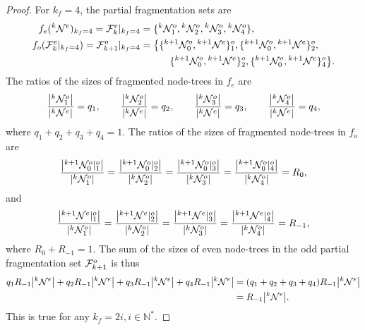\begin{proof}
  For $k_f = 4$, the partial fragmentation sets are
  \begin{align*}
    f_e({}^{k}\mathcal{N}^e)_{k_f = 4} 
    = \mathcal{F}^e_{k}|_{k_f = 4} 
    &=\{ {}^{k}\mathcal{N}^{o}_1, {}^{k}\mathcal{N}^{o}_2,  {}^{k}\mathcal{N}^{o}_3,{}^{k}\mathcal{N}^{o}_4\},  \\
    f_o(\mathcal{F}^e_{k}|_{k_f = 4}) 
    = \mathcal{F}^o_{k+1} |_{k_f = 4} 
    &= \big\{      \{ {}^{k+1}\mathcal{N}^{o}_0, {}^{k+1}\mathcal{N}^e\}^o_1, 
                    \{ {}^{k+1}\mathcal{N}^{o}_0, {}^{k+1}\mathcal{N}^e\}^o_2, \\
    & \hspace{3em} \{ {}^{k+1}\mathcal{N}^{o}_0, {}^{k+1}\mathcal{N}^e\}^o_2,
                    \{ {}^{k+1}\mathcal{N}^{o}_0, {}^{k+1}\mathcal{N}^e\}^o_4 \big\}. 
  \end{align*}
  The ratios of the sizes of fragmented node-trees in $f_e$ are
  \begin{equation*}
    \frac{\abs{{}^{k} \mathcal{N}^{o}_1}}{\abs{{}^{k}\mathcal{N}^e}} = q_1, \hspace{2em}
    \frac{\abs{{}^{k} \mathcal{N}^{o}_2}}{\abs{{}^{k}\mathcal{N}^e}} = q_2, \hspace{2em}
    \frac{\abs{{}^{k} \mathcal{N}^{o}_3}}{\abs{{}^{k}\mathcal{N}^e}} = q_3, \hspace{2em}
    \frac{\abs{{}^{k} \mathcal{N}^{o}_4}}{\abs{{}^{k}\mathcal{N}^e}} = q_4, 
  \end{equation*}
  where $ q_1 + q_2 + q_3 + q_4 = 1$. The ratios of the sizes of fragmented node-trees in $f_o$ are
  \begin{equation*}
    \frac{\abs{{}^{k+1}\mathcal{N}^o_0|^o_1}}{\abs{{}^{k} \mathcal{N}^{o}_1}} = 
    \frac{\abs{{}^{k+1}\mathcal{N}^o_0|^o_2}}{\abs{{}^{k} \mathcal{N}^{o}_2}} = 
    \frac{\abs{{}^{k+1}\mathcal{N}^o_0|^o_3}}{\abs{{}^{k} \mathcal{N}^{o}_3}} = 
    \frac{\abs{{}^{k+1}\mathcal{N}^o_0|^o_4}}{\abs{{}^{k} \mathcal{N}^{o}_4}} = R_0,
  \end{equation*}
  and 
  \begin{equation*}
    \frac{\abs{{}^{k+1}\mathcal{N}^e|^o_1}}{\abs{{}^{k} \mathcal{N}^{o}_1}} = 
    \frac{\abs{{}^{k+1}\mathcal{N}^e|^o_2}}{\abs{{}^{k} \mathcal{N}^{o}_2}} = 
    \frac{\abs{{}^{k+1}\mathcal{N}^e|^o_3}}{\abs{{}^{k} \mathcal{N}^{o}_3}} = 
    \frac{\abs{{}^{k+1}\mathcal{N}^e|^o_4}}{\abs{{}^{k} \mathcal{N}^{o}_4}} = R_{-1},  
  \end{equation*}
  where $R_0 + R_{-1} = 1$. The sum of the sizes of even node-trees in  the odd partial fragmentation set $\mathcal{F}^o_{k+1}$ is thus
  \begin{align*}
    q_1 R_{-1} \abs{{}^{k}\mathcal{N}^e} + q_2 R_{-1} \abs{{}^{k}\mathcal{N}^e} + q_3 R_{-1} \abs{{}^{k}\mathcal{N}^e} + q_4 R_{-1} \abs{{}^{k}\mathcal{N}^e} 
    &= (q_1 + q_2 + q_3 + q_4 ) R_{-1} \abs{{}^{k}\mathcal{N}^e} \\
    &= R_{-1} \abs{{}^{k}\mathcal{N}^e}. 
  \end{align*}
  This is true for any $k_f = 2i, i\in \mathbb{N}^*$. 
\end{proof}

